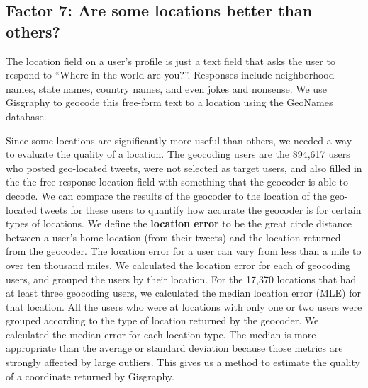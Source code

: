 \documentclass{sig-alternate}
\begin{document}
\subsection{Factor 7: Are some locations better than others?}
The location field on a user's profile is just a text field that asks the user
to respond to ``Where in the world are you?''.
%
Responses include neighborhood names, state names, country names, and even
jokes and nonsense.
%
We use Gisgraphy
to geocode this free-form text to a location using the GeoNames database.

Since some locations are significantly more useful than others, we needed a way
to evaluate the quality of a location.
%
The geocoding users are the 894,617 users who posted geo-located tweets, were not
selected as target users, and also filled in the the free-response location
field with something that the geocoder is able to decode.
%
We can compare the results of the geocoder to the location of the geo-located
tweets for these users to quantify how accurate the geocoder is for certain
types of locations.
%
We define the \textbf{location error} to be the great circle distance between a
user's home location (from their tweets) and the location returned from the geocoder.
The location error for a user can vary from less than a mile to over ten
thousand miles.
%
We calculated the location error for each of geocoding users, and grouped the
users by their location.
%
For the 17,370 locations that had at least three geocoding users, we calculated
the median location error (MLE) for that location.
%
All the users who were at locations with only one or two users were grouped
according to the type of location returned by the geocoder.
%
We calculated the median error for each location type.
%
The median is more appropriate than the average or standard deviation because
those metrics are strongly affected by large outliers.
%
%
This gives us a method to estimate the quality of a coordinate returned by
Gisgraphy.
\end{document}
